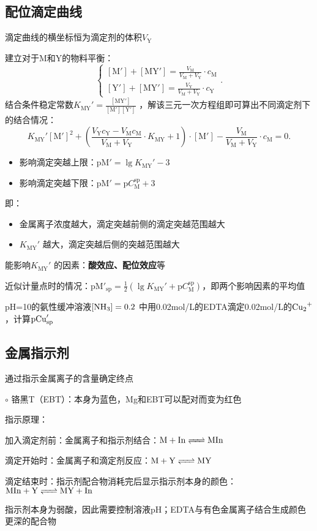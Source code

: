 \subsection{配位滴定曲线}%
\label{sub:配位滴定曲线}
\begin{notation}
    滴定曲线的横坐标恒为滴定剂的体积$V_\text{Y}$
\end{notation}
建立对于M和Y的物料平衡：\[
    \begin{cases}
        [\text{M}']+[\text{MY}']=\frac{V_\text{M}}{V_\text{M}+V_\text{Y}}\cdot c_\text{M}\\
        [\text{Y}']+[\text{MY}']=\frac{V_\text{Y}}{V_\text{M}+V_\text{Y}}\cdot c_\text{Y}
    \end{cases}
.\]
结合条件稳定常数$K_\text{MY}'=\frac{[\text{MY}']}{[\text{M}'][\text{Y}']}$ ，解该三元一次方程组即可算出不同滴定剂下的结合情况：\[
    K_\text{MY}'[\text{M}']^2 +\left( \frac{V_\text{Y}c_\text{Y}-V_\text{M}c_\text{M}}{V_\text{M}+V_\text{Y}}\cdot K_\text{MY}+1 \right)\cdot [\text{M}']-\frac{V_\text{M}}{V_\text{M}+V_\text{Y}}\cdot c_\text{M}=0
.\]
\begin{itemize}
    \item 影响滴定突越上限：$\text{pM}'=\lg K_\text{MY}'-3$
    \item 影响滴定突越下限：$\text{pM}'=\text{p}C_\text{M}^{\text{sp}}+3$
\end{itemize}
即：
\begin{itemize}
    \item 金属离子浓度越大，滴定突越前侧的滴定突越范围越大
    \item $K_\text{MY}'$ 越大，滴定突越后侧的突越范围越大
\end{itemize}
能影响$K_{\text{MY}}'$ 的因素：\textbf{酸效应、配位效应}等

近似计量点时的情况：$\text{pM}'_\text{sp}=\frac{1}{2}\left( \lg K_\text{MY}'+\text{p}C_\text{M}^{\text{sp}} \right)$，即两个影响因素的平均值
\begin{eg}
    pH=10的氨性缓冲溶液$[\ce{NH_3}]=0.2$ 中用0.02mol/L的EDTA滴定0.02mol/L的$\ce{Cu2+}$，计算$\text{p}\ce{Cu}'_{\text{sp}}$
\end{eg}
\subsection{金属指示剂}%
\label{sub:金属指示剂}
\begin{notation}
    通过指示金属离子的含量确定终点
\end{notation}
$\circ$ 铬黑T（EBT）：本身为蓝色，Mg和EBT可以配对而变为红色
\begin{notation}
    指示原理：

    加入滴定剂前：金属离子和指示剂结合：$\ce{M +In}\ce{<=>[][]}\ce{MIn}$ 

    滴定开始时：金属离子和滴定剂反应：$\ce{M +Y}\ce{<=>[][]}\ce{MY}$ 

    滴定结束时：指示剂配合物消耗完后显示指示剂本身的颜色：$\ce{MIn +Y}\ce{<=>[][]}\ce{MY +In}$
\end{notation}
\begin{notation}
    指示剂本身为弱酸，因此需要控制溶液pH；EDTA与有色金属离子结合生成颜色更深的配合物
\end{notation}
